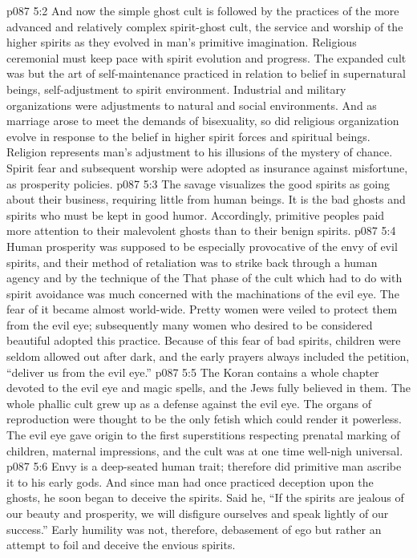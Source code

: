 \vs p087 5:2 And now the simple ghost cult is followed by the practices of the more advanced and relatively complex spirit\hyp{}ghost cult, the service and worship of the higher spirits as they evolved in man’s primitive imagination. Religious ceremonial must keep pace with spirit evolution and progress. The expanded cult was but the art of self\hyp{}maintenance practiced in relation to belief in supernatural beings, self\hyp{}adjustment to spirit environment. Industrial and military organizations were adjustments to natural and social environments. And as marriage arose to meet the demands of bisexuality, so did religious organization evolve in response to the belief in higher spirit forces and spiritual beings. Religion represents man’s adjustment to his illusions of the mystery of chance. Spirit fear and subsequent worship were adopted as insurance against misfortune, as prosperity policies.
\vs p087 5:3 The savage visualizes the good spirits as going about their business, requiring little from human beings. It is the bad ghosts and spirits who must be kept in good humor. Accordingly, primitive peoples paid more attention to their malevolent ghosts than to their benign spirits.
\vs p087 5:4 Human prosperity was supposed to be especially provocative of the envy of evil spirits, and their method of retaliation was to strike back through a human agency and by the technique of the  That phase of the cult which had to do with spirit avoidance was much concerned with the machinations of the evil eye. The fear of it became almost world\hyp{}wide. Pretty women were veiled to protect them from the evil eye; subsequently many women who desired to be considered beautiful adopted this practice. Because of this fear of bad spirits, children were seldom allowed out after dark, and the early prayers always included the petition, “deliver us from the evil eye.”
\vs p087 5:5 The Koran contains a whole chapter devoted to the evil eye and magic spells, and the Jews fully believed in them. The whole phallic cult grew up as a defense against the evil eye. The organs of reproduction were thought to be the only fetish which could render it powerless. The evil eye gave origin to the first superstitions respecting prenatal marking of children, maternal impressions, and the cult was at one time well\hyp{}nigh universal.
\vs p087 5:6 Envy is a deep\hyp{}seated human trait; therefore did primitive man ascribe it to his early gods. And since man had once practiced deception upon the ghosts, he soon began to deceive the spirits. Said he, “If the spirits are jealous of our beauty and prosperity, we will disfigure ourselves and speak lightly of our success.” Early humility was not, therefore, debasement of ego but rather an attempt to foil and deceive the envious spirits.\plusone
